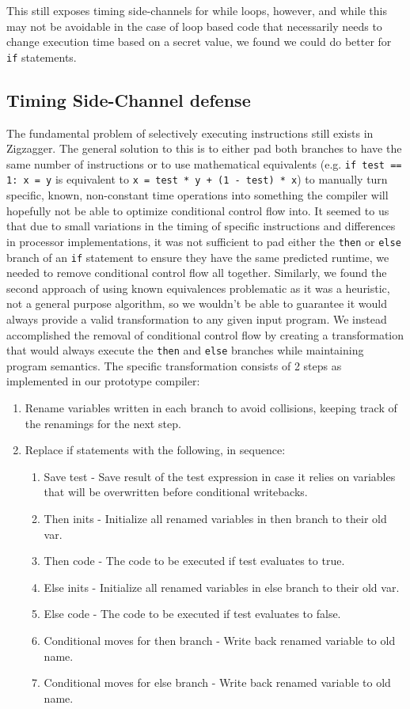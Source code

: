 \documentclass[sigplan, review]{acmart}
\begin{document}
This still exposes timing side-channels for while loops, however, and while this may not be avoidable in the case of loop based code that necessarily needs to change execution time based on a secret value, we found we could do better for \texttt{if} statements.

\subsection{Timing Side-Channel defense}
The fundamental problem of selectively executing instructions still exists in Zigzagger. The general solution to this is to either pad both branches to have the same number of instructions or to use mathematical equivalents (e.g. \texttt{if test == 1: x = y} is equivalent to \texttt{x = test * y + (1 - test) * x}) to manually turn specific, known, non-constant time operations into something the compiler will hopefully not be able to optimize conditional control flow into. It seemed to us that due to small variations in the timing of specific instructions and differences in processor implementations, it was not sufficient to pad either the \texttt{then} or \texttt{else} branch of an \texttt{if} statement to ensure they have the same predicted runtime, we needed to remove conditional control flow all together. Similarly, we found the second approach of using known equivalences problematic as it was a heuristic, not a general purpose algorithm, so we wouldn't be able to guarantee it would always provide a valid transformation to any given input program. We instead accomplished the removal of conditional control flow by creating a transformation that would always execute the \texttt{then} and \texttt{else} branches while maintaining program semantics. The specific transformation consists of 2 steps as implemented in our prototype compiler:

\begin{enumerate}
   \item Rename variables written in each branch to avoid collisions, keeping track of the renamings for the next step.
   \item Replace if statements with the following, in sequence:
   \begin{enumerate}
       \item Save test - Save result of the test expression in case it relies on variables that will be overwritten before conditional writebacks.
       \item Then inits - Initialize all renamed variables in then branch to their old var.
       \item Then code - The code to be executed if test evaluates to true.
       \item Else inits - Initialize all renamed variables in else branch to their old var.
       \item Else code - The code to be executed if test evaluates to false.
       \item Conditional moves for then branch - Write back renamed variable to old name.
       \item Conditional moves for else branch - Write back renamed variable to old name.
   \end{enumerate}
\end{enumerate}
\end{document}
